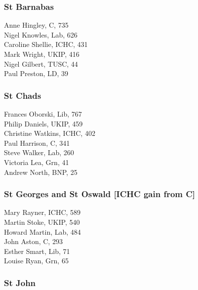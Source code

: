 \documentclass[a4paper,openany,10pt]{book}
\begin{document}
\subsubsection*{St Barnabas}



Anne Hingley, C, 735\\
Nigel Knowles, Lab, 626\\
Caroline Shellie, ICHC, 431\\
Mark Wright, UKIP, 416\\
Nigel Gilbert, TUSC, 44\\
Paul Preston, LD, 39\\


\subsubsection*{St Chads}



Frances Oborski, Lib, 767\\
Philip Daniels, UKIP, 459\\
Christine Watkins, ICHC, 402\\
Paul Harrison, C, 341\\
Steve Walker, Lab, 260\\
Victoria Lea, Grn, 41\\
Andrew North, BNP, 25\\


\subsubsection*{St Georges and St Oswald \hspace*{\fill}\nolinebreak[1]%
\enspace\hspace*{\fill}
[ICHC gain from C]}



Mary Rayner, ICHC, 589\\
Martin Stoke, UKIP, 540\\
Howard Martin, Lab, 484\\
John Aston, C, 293\\
Esther Smart, Lib, 71\\
Louise Ryan, Grn, 65\\


\subsubsection*{St John}
\end{document}
